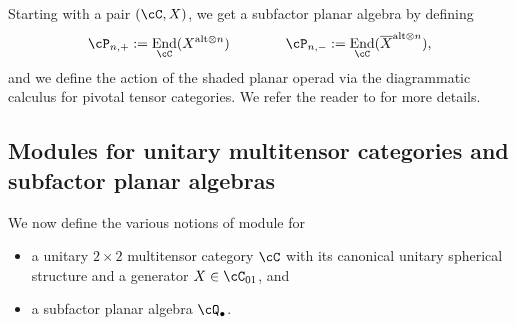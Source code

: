 \documentclass[11pt]{article}
\theoremstyle{plain}
\theoremstyle{definition}
\DeclareMathOperator{\End}{End}
\begin{document}
Starting with a pair $(\cC, X)$, we get a subfactor planar algebra by defining
$$
\cP_{n,+} := \End_\cC(X^{ \text{alt} \otimes n})
\qquad\qquad
\cP_{n,-} := \End_\cC(\overline{X}^{ \text{alt} \otimes n}),
$$
and we define the action of the shaded planar operad via the diagrammatic calculus for pivotal tensor categories.
We refer the reader to \cite{MR2811311,1808.00323} for more details.

\subsection{Modules for unitary multitensor categories and subfactor planar algebras}
\label{ssec:moduledefs}
\label{sec:3TypesOfModules}

We now define the various notions of module for 
\begin{itemize}
\item
a unitary $2\times 2$ multitensor category $\cC$ with its canonical unitary spherical structure and a generator $X\in \cC_{01}$,
and
\item
a subfactor planar algebra $\cQ_\bullet$.
\end{itemize}
\end{document}
